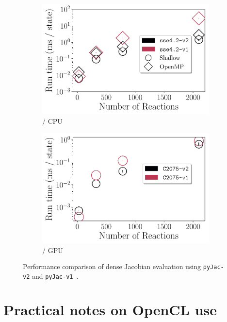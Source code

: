 \documentclass[12pt,number,sort&compress,preprint]{elsarticle}
\begin{document}
\begin{figure}[htbp]
   \centering
  \begin{subfigure}[t]{0.48\linewidth}
      \includegraphics[width=\textwidth]{v1_vs_v2.pdf}
      \caption{\sse/ CPU}
      \label{F:v1_vs_v2_cpu}
  \end{subfigure}
  \hfill
  \begin{subfigure}[t]{0.48\linewidth}
      \includegraphics[width=\textwidth]{v1_vs_v2_gpu.pdf}
      \caption{\gpuold/ GPU}
      \label{F:v1_vs_v2_gpu}
  \end{subfigure}
  \caption{Performance comparison of dense Jacobian evaluation using \texttt{pyJac-v2} and \texttt{pyJac-v1}~\cite{pyjac16}.}
  \label{F:v1_vs_v2}
\end{figure}

\section{Practical notes on OpenCL use}
\label{S:opencl}
\end{document}
